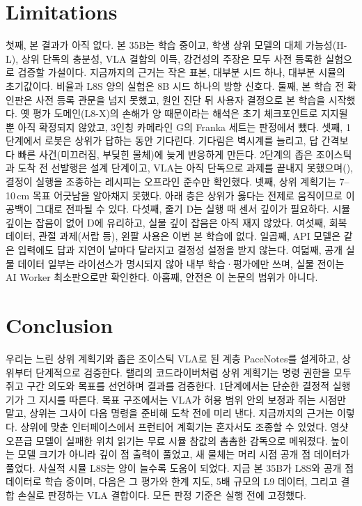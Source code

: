 \section{Limitations}
\label{sec:limits}
첫째, 본 결과가 아직 없다. 본 35B는 학습 중이고, 학생 상위 모델의 대체 가능성(H-L), 상위 단독의 충분성, VLA 결합의 이득, 강건성의 주장은 모두 사전 등록한 실험으로 검증할 가설이다. 지금까지의 근거는 작은 표본, 대부분 시드 하나, 대부분 시뮬의 초기값이다. 비율과 L8S 양의 실험은 8B 시드 하나의 방향 신호다. 둘째, 본 학습 전 확인판은 사전 등록 관문을 넘지 못했고, 원인 진단 뒤 사용자 결정으로 본 학습을 시작했다. 옛 평가 도메인(L8-X)의 손해가 양 때문이라는 해석은 초기 체크포인트로 지지될 뿐 아직 확정되지 않았고, 3인칭 카메라인 G의 Franka 세트는 판정에서 뺐다. 셋째, 1단계에서 로봇은 상위가 답하는 동안 기다린다. 기다림은 벽시계를 늘리고, 답 간격보다 빠른 사건(미끄러짐, 부딪힌 물체)에 늦게 반응하게 만든다. 2단계의 좁은 조이스틱과 도착 전 선발행은 설계 단계이고, VLA는 아직 단독으로 과제를 끝내지 못했으며(), 결정이 실행을 조종하는 레시피는 오프라인 준수만 확인했다. 넷째, 상위 계획기는 7--10\,cm 목표 어긋남을 알아채지 못했다. 아래 층은 상위가 옳다는 전제로 움직이므로 이 공백이 그대로 전파될 수 있다. 다섯째, 줄기 D는 실행 때 센서 깊이가 필요하다. 시뮬 깊이는 잡음이 없어 D에 유리하고, 실물 깊이 잡음은 아직 재지 않았다. 여섯째, 회복 데이터, 관절 과제(서랍 등), 왼팔 사용은 이번 본 학습에 없다. 일곱째, API 모델은 같은 입력에도 답과 지연이 날마다 달라지고 결정성 설정을 받지 않는다. 여덟째, 공개 실물 데이터 일부는 라이선스가 명시되지 않아 내부 학습·평가에만 쓰며, 실물 전이는 AI Worker 최소판으로만 확인한다. 아홉째, 안전은 이 논문의 범위가 아니다.

\section{Conclusion}
\label{sec:conclusion}
우리는 느린 상위 계획기와 좁은 조이스틱 VLA로 된 계층 PaceNotes를 설계하고, 상위부터 단계적으로 검증한다. 랠리의 코드라이버처럼 상위 계획기는 명령 권한을 모두 쥐고 구간 의도와 목표를 선언하며 결과를 검증한다. 1단계에서는 단순한 결정적 실행기가 그 지시를 따른다. 목표 구조에서는 VLA가 허용 범위 안의 보정과 쥐는 시점만 맡고, 상위는 그사이 다음 명령을 준비해 도착 전에 미리 낸다. 지금까지의 근거는 이렇다. 상위에 맞춘 인터페이스에서 프런티어 계획기는 혼자서도 조종할 수 있었다. 영샷 오픈급 모델이 실패한 위치 읽기는 무료 시뮬 참값의 촘촘한 감독으로 메워졌다. 높이는 모델 크기가 아니라 깊이 점 출력이 풀었고, 새 물체는 머리 시점 공개 점 데이터가 풀었다. 사실적 시뮬 L8S는 양이 늘수록 도움이 되었다. 지금 본 35B가 L8S와 공개 점 데이터로 학습 중이며, 다음은 그 평가와 한계 지도, 5배 규모의 L9 데이터, 그리고 결합 손실로 판정하는 VLA 결합이다. 모든 판정 기준은 실행 전에 고정했다.
